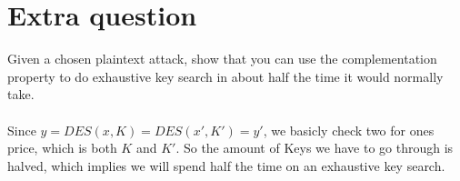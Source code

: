 \documentclass[paper=a4, fontsize=11pt]{scrartcl} %
\numberwithin{equation}{section} %
\numberwithin{figure}{section} %
\numberwithin{table}{section} %
\begin{document}
	\section{Extra question}
	Given a chosen plaintext attack, show that you can use the complementation property to do exhaustive key search in about half the time it would normally take. \\ \\
	Since $y = DES(x,K)=DES(x',K')=y'$, we basicly check two for ones price, which is both $K$ and $K'$. So the amount of Keys we have to go through is halved, which implies we will spend half the time on an exhaustive key search.
	
\end{document}
